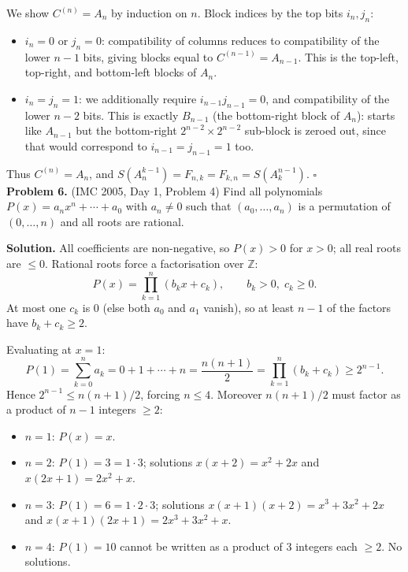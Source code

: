 \documentclass{article}
\newcommand{\Z}{\mathbb{Z}}
\begin{document}
We show \( C^{(n)} = A_n \) by induction on \( n \). Block indices by the top bits \( i_n, j_n \):
\begin{itemize}
    \item \( i_n = 0 \) or \( j_n = 0 \): compatibility of columns reduces to compatibility of the lower \( n-1 \) bits, giving blocks equal to \( C^{(n-1)} = A_{n-1} \). This is the top-left, top-right, and bottom-left blocks of \( A_n \).
    \item \( i_n = j_n = 1 \): we additionally require \( i_{n-1} j_{n-1} = 0 \), and compatibility of the lower \( n-2 \) bits. This is exactly \( B_{n-1} \) (the bottom-right block of \( A_n \)): starts like \( A_{n-1} \) but the bottom-right \( 2^{n-2} \times 2^{n-2} \) sub-block is zeroed out, since that would correspond to \( i_{n-1} = j_{n-1} = 1 \) too.
\end{itemize}
Thus \( C^{(n)} = A_n \), and \( S(A_n^{k-1}) = F_{n,k} = F_{k,n} = S(A_k^{n-1}) \). \hfill\(\square\)
\\

\textbf{Problem 6.} (IMC 2005, Day 1, Problem 4)
Find all polynomials \( P(x) = a_n x^n + \cdots + a_0 \) with \( a_n \neq 0 \) such that \( (a_0, \ldots, a_n) \) is a permutation of \( (0, \ldots, n) \) and all roots are rational.

\textbf{Solution.}
All coefficients are non-negative, so \( P(x) > 0 \) for \( x > 0 \); all real roots are \( \leq 0 \). Rational roots force a factorisation over \( \Z \):
\[
P(x) = \prod_{k=1}^n (b_k x + c_k), \qquad b_k > 0, \; c_k \geq 0.
\]
At most one \( c_k \) is \( 0 \) (else both \( a_0 \) and \( a_1 \) vanish), so at least \( n-1 \) of the factors have \( b_k + c_k \geq 2 \).

Evaluating at \( x = 1 \):
\[
P(1) = \sum_{k=0}^n a_k = 0 + 1 + \cdots + n = \frac{n(n+1)}{2} = \prod_{k=1}^n (b_k + c_k) \geq 2^{n-1}.
\]
Hence \( 2^{n-1} \leq n(n+1)/2 \), forcing \( n \leq 4 \). Moreover \( n(n+1)/2 \) must factor as a product of \( n-1 \) integers \( \geq 2 \):
\begin{itemize}
    \item \( n = 1 \): \( P(x) = x \).
    \item \( n = 2 \): \( P(1) = 3 = 1 \cdot 3 \); solutions \( x(x+2) = x^2 + 2x \) and \( x(2x+1) = 2x^2 + x \).
    \item \( n = 3 \): \( P(1) = 6 = 1 \cdot 2 \cdot 3 \); solutions \( x(x+1)(x+2) = x^3 + 3x^2 + 2x \) and \( x(x+1)(2x+1) = 2x^3 + 3x^2 + x \).
    \item \( n = 4 \): \( P(1) = 10 \) cannot be written as a product of 3 integers each \( \geq 2 \). No solutions.
\end{itemize}
\end{document}
